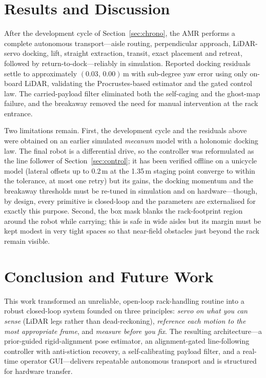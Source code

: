 \documentclass[11pt,a4paper]{article}
\begin{document}
\section{Results and Discussion}\label{sec:results}
After the development cycle of Section~\ref{sec:chrono}, the AMR performs a
complete autonomous transport---aisle routing, perpendicular approach,
LiDAR-servo docking, lift, straight extraction, transit, exact placement and
retreat, followed by return-to-dock---reliably in simulation. Reported
docking residuals settle to approximately $(0.03,\,0.00)$\,m with sub-degree
yaw error using only on-board LiDAR, validating the Procrustes-based
estimator and the gated control law. The carried-payload filter eliminated
both the self-caging and the ghost-map failure, and the breakaway removed the
need for manual intervention at the rack entrance.

Two limitations remain. First, the development cycle and the residuals
above were obtained on an earlier simulated \emph{mecanum} model with a
holonomic docking law. The final robot is a differential drive, so the
controller was reformulated as the line follower of
Section~\ref{sec:control}; it has been verified offline on a unicycle model
(lateral offsets up to 0.2\,m at the 1.35\,m staging point converge to within
the tolerance, at most one retry) but its gains, the docking momentum and the
breakaway thresholds must be re-tuned in simulation and on hardware---though,
by design, every primitive is closed-loop and the parameters are externalised
for exactly this purpose. Second, the box
mask blanks the rack-footprint region around the robot while carrying; this
is safe in wide aisles but its margin must be kept modest in very tight
spaces so that near-field obstacles just beyond the rack remain visible.

\section{Conclusion and Future Work}\label{sec:concl}
This work transformed an unreliable, open-loop rack-handling routine into a
robust closed-loop system founded on three principles: \emph{servo on what
you can sense} (LiDAR legs rather than dead-reckoning), \emph{reference each
motion to the most appropriate frame}, and \emph{measure before you fix}. The
resulting architecture---a prior-guided rigid-alignment pose estimator, an
alignment-gated line-following controller with anti-stiction recovery, a
self-calibrating payload filter, and a real-time operator GUI---delivers
repeatable autonomous transport and is structured for hardware transfer.
\end{document}
